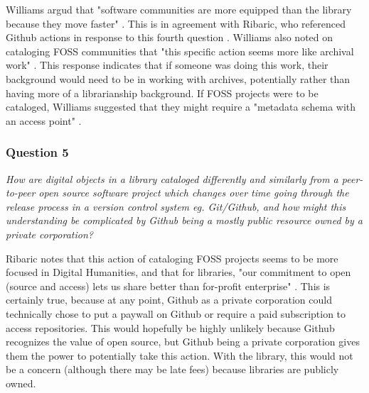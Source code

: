 Williams argud that "software communities are more equipped than the library because they move faster" \cite{patrickinterview}. This is in agreement with Ribaric, who referenced Github actions in response to this fourth question \cite{timinterview}. Williams also noted on cataloging FOSS communities that "this specific action seems more like archival work" \cite{patrickinterview}. This response indicates that if someone was doing this work, their background would need to be in working with archives, potentially rather than having more of a librarianship background. If FOSS projects were to be cataloged, Williams suggested that they might require a "metadata schema with an access point" \cite{patrickinterview}.  

\subsubsection{Question 5}

\textit{How are digital objects in a library cataloged differently and similarly from a peer-to-peer open source software project which changes over time going through the release process in a version control system eg. Git/Github, and how might this understanding be complicated by Github being a mostly public resource owned by a private corporation?}
\hspace*{\fill}

Ribaric notes that this action of cataloging FOSS projects seems to be more focused in Digital Humanities, and that for libraries, "our commitment to open (source and access) lets us share better than for-profit enterprise" \cite{timinterview}. This is certainly true, because at any point, Github as a private corporation could technically chose to put a paywall on Github or require a paid subscription to access repositories. This would hopefully be highly unlikely because Github recognizes the value of open source, but Github being a private corporation gives them the power to potentially take this action. With the library, this would not be a concern (although there may be late fees) because libraries are publicly owned. 

